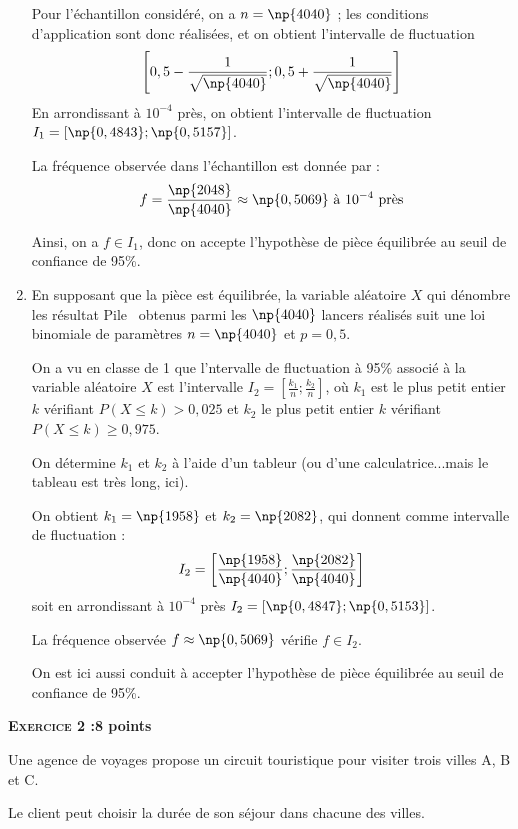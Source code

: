\documentclass[12pt,french]{article}
\begin{document}
\begin{spacing}{1.2}
\begin{enumerate}
Pour l'échantillon considéré, on a $n=\np{4040}$ ; les conditions d'application sont donc réalisées, et on obtient l'intervalle de fluctuation 
\[\left[0,5-\frac{1}{\sqrt{\np{4040}}};0,5+\frac{1}{\sqrt{\np{4040}}}\right]\]
En arrondissant à $10^{-4}$ près, on obtient l'intervalle de fluctuation $I_1=[\np{0,4843};\np{0,5157}]$.

La fréquence observée dans l'échantillon est donnée par :
\[f=\frac{\np{2048}}{\np{4040}}\approx \np{0,5069}~\text{à}~10^{-4}~\text{près}\]

Ainsi, on a $f\in I_1$, donc on accepte l'hypothèse de pièce équilibrée au seuil de confiance de 95\%.

\item En supposant que la pièce est équilibrée, la variable aléatoire $X$ qui dénombre les résultat \og Pile\fg~ obtenus parmi les $\np{4040}$ lancers réalisés suit une loi binomiale de paramètres $n=\np{4040}$ et $p=0,5$.

On a vu en classe de 1 que l'ntervalle de fluctuation à 95\% associé à la variable aléatoire $X$ est l'intervalle $I_2=\left[\frac{k_1}{n};\frac{k_2}{n}\right]$, où $k_1$ est le plus petit entier $k$ vérifiant $P(X\leq k)> 0,025$ et $k_2$ le plus petit entier $k$ vérifiant $P(X\leq k)\geq 0,975$.

On détermine $k_1$ et $k_2$ à l'aide d'un tableur (ou d'une calculatrice...mais le tableau est très long, ici).

On obtient $k_1=\np{1958}$ et $k_2=\np{2082}$, qui donnent comme intervalle de fluctuation :
\[I_2=\left[\frac{\np{1958}}{\np{4040}};\frac{\np{2082}}{\np{4040}}\right]\]
soit en arrondissant à $10^{-4}$ près $I_2=[\np{0,4847};\np{0,5153}]$.

La fréquence observée $f\approx \np{0,5069}$ vérifie $f\in I_2$.

On est ici aussi conduit à accepter l'hypothèse de pièce équilibrée au seuil de confiance de 95\%.
\end{enumerate}

\newpage
\textbf{\textsc{Exercice 2 :}\hfill 8 points}%
\medskip

Une agence de voyages propose un circuit touristique pour visiter trois villes A, B et C.

Le client peut choisir la durée de son séjour dans chacune des villes.


\end{spacing}
\end{document}
